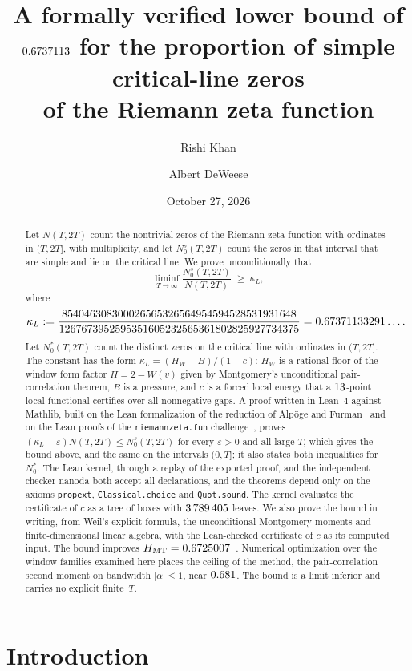 \documentclass[11pt]{article}
\title{A formally verified lower bound of \\ $0.6737113$ for the proportion of simple critical-line zeros \\ of the Riemann zeta function}
\author{Rishi Khan \and Albert DeWeese}
\date{October 27, 2026}
\theoremstyle{definition}
\newcommand{\eps}{\varepsilon}
\begin{document}
\maketitle

\begin{abstract}
Let $N(T,2T)$ count the nontrivial zeros of the Riemann zeta function with
ordinates in $(T,2T]$, with multiplicity, and let $N_0^s(T,2T)$ count the
zeros in that interval that are simple and lie on the critical line. We prove
unconditionally that
\[
  \liminf_{T\to\infty}\frac{N_0^s(T,2T)}{N(T,2T)}\;\ge\;\kappa_L,
\]
where
\[
  \kappa_L:=\frac{854046308300026565326564954594528531931648}{1267673952595351605232565361802825927734375}=0.67371133291\ldots .
\]
Let $N_0^*(T,2T)$ count the distinct zeros on the critical line with
ordinates in $(T,2T]$. The constant has the form $\kappa_L=(H_W^--B)/(1-c)$: $H_W^-$ is a rational floor of the
window form factor $H=2-W(v)$ given by Montgomery's unconditional
pair-correlation theorem, $B$ is a pressure, and $c$ is a forced local energy
that a $13$-point local functional certifies over all nonnegative gaps. A
proof written in Lean~4 against Mathlib, built on the Lean formalization of
the reduction of Alp\"oge and Furman~\cite{Zeta23Lean} and on the Lean proofs
of the \texttt{riemannzeta.fun} challenge~\cite{RZF26,Lav26}, proves
$(\kappa_L-\eps)N(T,2T)\le N_0^s(T,2T)$ for every $\eps>0$ and all large $T$,
which gives the bound above, and the same on the intervals $(0,T]$; it also
states both inequalities for $N_0^*$. The Lean kernel, through a replay of
the exported proof, and the independent checker nanoda both accept all
declarations, and the theorems depend only on the axioms \texttt{propext},
\texttt{Classical.choice} and \texttt{Quot.sound}. The kernel evaluates the
certificate of $c$ as a tree of boxes with $3\,789\,405$ leaves. We also prove
the bound in writing, from Weil's explicit formula, the unconditional
Montgomery moments and finite-dimensional linear algebra, with the
Lean-checked certificate of $c$ as its computed input. The bound improves
$H_{\mathrm{MT}}=0.6725007$~\cite{AF26}. Numerical optimization
over the window families examined here places the ceiling of the method, the
pair-correlation second moment on bandwidth $|\alpha|\le1$, near
$0.681$. The bound is a limit inferior and carries no explicit
finite~$T$.
\end{abstract}

\section{Introduction}\label{sec:intro}
\end{document}

